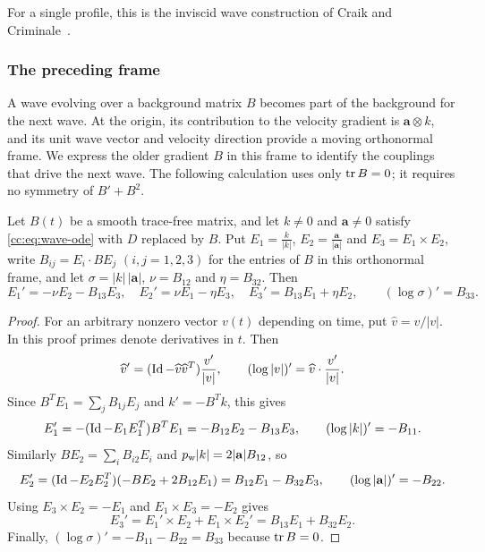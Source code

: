 For a single profile, this is the inviscid wave construction of
Craik and Criminale~\cite{CraikCriminale}.

\subsubsection{The preceding frame}\label{cc:sec:frame}
A wave evolving over a background matrix $B$ becomes part of the
background for the next wave. At the origin, its contribution to the
velocity gradient is $\mathbf a\otimes k$, and its unit wave vector and
velocity direction provide a moving orthonormal frame. We express the
older gradient $B$ in this frame to identify the couplings that drive the
next wave. The following calculation uses only $\operatorname{tr} B=0$; it requires no
symmetry of $B'+B^2$.

\begin{lemma}\label{cc:lem:frame}
Let $B(t)$ be a smooth trace-free matrix, and let $k\ne0$ and
$\mathbf a\ne0$ satisfy \eqref{cc:eq:wave-ode} with $D$ replaced by $B$.
Put $E_1=\frac{k}{|k|}$, $E_2=\frac{\mathbf a}{|\mathbf a|}$ and $E_3=E_1\times E_2$,
write $B_{ij}=E_i\cdot BE_j$ $(i,j=1,2,3)$ for the entries of $B$ in this
orthonormal frame, and let $\sigma=|k|\,|\mathbf a|$, $\nu=B_{12}$ and
$\eta=B_{32}$. Then
\begin{equation}\label{cc:eq:frame}
 E_1'=-\nu E_2-B_{13}E_3,\quad
 E_2'=\nu E_1-\eta E_3,\quad
 E_3'=B_{13}E_1+\eta E_2,
 \qquad(\log\sigma)'=B_{33}.
\end{equation}
\end{lemma}
\begin{proof}
For an arbitrary nonzero vector $v(t)$ depending on time, put
$\widehat v=v/|v|$. In this proof primes denote derivatives in $t$.
Then
\[
 \widehat v'=(\operatorname{Id}-\widehat v\widehat v^T)\frac{v'}{|v|},\qquad
 (\log|v|)'=\widehat v\cdot\frac{v'}{|v|}.
\]
Since $B^TE_1=\sum_jB_{1j}E_j$ and $k'=-B^Tk$, this gives
\[
 E_1'=-(\operatorname{Id}-E_1E_1^T)B^TE_1=-B_{12}E_2-B_{13}E_3,\qquad
 (\log|k|)'=-B_{11}.
\]
Similarly $BE_2=\sum_iB_{i2}E_i$ and
$p_{\rm w}|k|=2|\mathbf a|B_{12}$, so
\[
 E_2'=(\operatorname{Id}-E_2E_2^T)(-BE_2+2B_{12}E_1)=B_{12}E_1-B_{32}E_3,
 \qquad (\log|\mathbf a|)'=-B_{22}.
\]
Using $E_3\times E_2=-E_1$ and $E_1\times E_3=-E_2$ gives
\[
 E_3'=E_1'\times E_2+E_1\times E_2'=B_{13}E_1+B_{32}E_2.
\]
Finally,
$(\log\sigma)'=-B_{11}-B_{22}=B_{33}$ because $\operatorname{tr} B=0$.
\end{proof}
